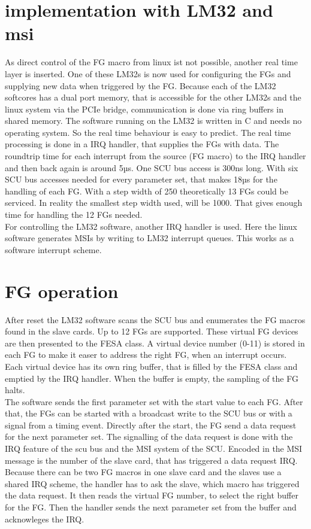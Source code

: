 \documentclass[a4paper,
              ]{jacow}
\begin{document}
\section{implementation with LM32 and msi}
As direct control of the FG macro from linux ist not possible, another real time layer is inserted. 
One of these LM32s is now used for configuring the FGs and supplying new data when triggered by the FG.
Because each of the LM32 softcores has a dual port memory, that is accessible for the other LM32s and the linux system via the PCIe bridge, communication is done via ring buffers in shared memory. The software running on the LM32 is written in C and needs no operating system. So the real time behaviour is easy to predict. The real time processing is done in a IRQ handler, that supplies the FGs with data. The roundtrip time for each interrupt from the source (FG macro) to the IRQ handler and then back again is around 5µs. One SCU bus access is 300ns long. With six SCU bus accesses needed for every parameter set, that makes 18µs for the handling of each FG. With a step width of 250 theoretically 13 FGs could be serviced. In reality the smallest step width used, will be 1000. That gives enough time for handling the 12 FGs needed.\\
For controlling the LM32 software, another IRQ handler is used. Here the linux software generates MSIs by writing to LM32 interrupt queues. This works as a software interrupt scheme.

\section{FG operation}
After reset the LM32 software scans the SCU bus and enumerates the FG macros found in the slave cards. Up to 12 FGs are supported. These virtual FG devices are then presented to the FESA class. A virtual device number (0-11) is stored in each FG to make it easer to address the right FG, when an interrupt occurs.
Each virtual device has its own ring buffer, that is filled by the FESA class and emptied by the IRQ handler.
When the buffer is empty, the sampling of the FG halts.\\
The software sends the first parameter set with the start value to each FG. After that, the FGs can be started with a broadcast write to the SCU bus or with a signal from a timing event. Directly after the start, the FG send a data request for the next parameter set. The signalling of the data request is done with the IRQ feature of the scu bus and the MSI system of the SCU. Encoded in the MSI message is the number of the slave card, that has triggered a data request IRQ. Because there can be two FG macros in one slave card and the slaves use a shared IRQ scheme, the handler has to ask the slave, which macro has triggered the data request. It then reads the virtual FG number, to select the right buffer for the FG. Then the handler sends the next parameter set from the buffer and acknowleges the IRQ.
\end{document}

